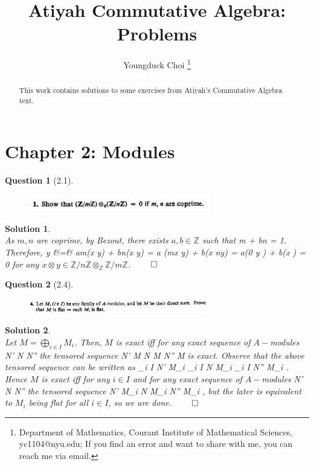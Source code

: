 \documentclass[11pt]{article}
\date{}
\title{\vspace{-0.7cm}
Atiyah Commutative Algebra: Problems}
\author{
Youngduck Choi 
\thanks{Department of Mathematics, Courant Institute of Mathematical Sciences, 
yc1104@nyu.edu; If you find an error and want to share with me, 
you can reach me via email.
}}
\theoremstyle{plain}
\def\eQb#1\eQe{\begin{eqnarray*}#1\end{eqnarray*}}
\theoremstyle{quest}
\newtheorem*{question}{Question}
\newtheorem*{solution}{Solution}
\begin{document}
\maketitle

\begin{abstract}
This work contains solutions to some
exercises from Atiyah's Commutative Algebra
text.
\end{abstract}


\section{Chapter 2: Modules} \label{sec:Modules}

\begin{question}[2.1]
\hfill
\begin{figure}[h!]
  \centering
    \includegraphics[width=0.7\textwidth]{d-2-1.png}
\end{figure}
\end{question}
\begin{solution} \hfill \\
As $m,n$ are coprime, by Bezout, there exists $a,b \in \mathbb{Z}$ such that
\eQb
am + bn = 1.
\eQe
Therefore, 
\eQb
x \otimes y &=& am(x \otimes y) + bn(x \otimes y) = a (mx \otimes y) + 
b(x \otimes ny) = a(0 \otimes y ) + b(x ) = 0 
\eQe
for any $x \otimes y \in \mathbb{Z}/n\mathbb{Z} 
\otimes_{\mathbb{Z}} \mathbb{Z}/m\mathbb{Z}$. 
\hfill $\qed$

\end{solution}

\bigskip

\begin{question}[2.4]
\hfill
\begin{figure}[h!]
  \centering
    \includegraphics[width=0.7\textwidth]{d-2-4.png}
\end{figure}
\end{question}
\begin{solution} \hfill \\
Let $M = \bigoplus_{i \in I} M_i$. Then, $M$ is exact iff for any exact sequence
of $A-$modules
\eQb
0 \to N' \to N \to N''  
\eQe 
the tensored sequence 
\eQb
0 \to N' \otimes M \to N \otimes M \to N'' \otimes M  
\eQe 
is exact. Observe that the above tensored sequence can be written as
\eQb
0 \to \bigoplus_{i \in I} N' \otimes M_i \to 
\bigoplus_{i \in I} N \otimes M_i \to
\bigoplus_{i \in I} N'' \otimes M_i . 
\eQe
Hence $M$ is exact iff for any $i \in I$ and for any exact sequence of $A-$modules
\eQb
0 \to N' \to N \to N''  
\eQe
the tensored sequence
\eQb
0 \to N' \otimes M_i  \to N \otimes M_i \to N'' \otimes M_i , 
\eQe
but the later is equivalent to $M_i$ being flat for all $i \in I$, so we are done.
\hfill $\qed$

\end{solution}
\end{document}
